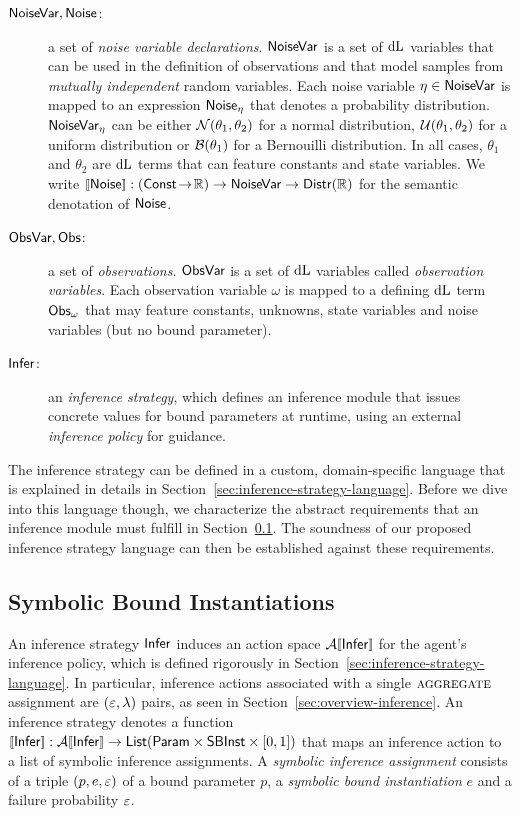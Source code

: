 \documentclass[acmsmall,screen,nonacm]{acmart}
\begin{document}
\begin{description}
  \item[$\mathsf{NoiseVar}, \mathsf{Noise}$:] a set of \emph{noise variable declarations}. $\mathsf{NoiseVar}$ is a set of $\mathop{}\!\mathrm{d} \text{L}$ variables that can be used in the definition of observations and that model samples from \emph{mutually independent} random variables. Each  {noise variable} $\eta \in \mathsf{NoiseVar}$ is mapped to an expression $\mathsf{Noise}_\eta$ that denotes a probability distribution. $\mathsf{NoiseVar}_\eta$ can be either $\mathcal{N}(\theta_1, \theta_2)$ for a normal distribution, $\mathcal{U}(\theta_1, \theta_2)$ for a uniform distribution or $\mathcal{B}(\theta_1)$ for a Bernouilli distribution. In all cases, $\theta_1$ and $\theta_2$ are $\mathop{}\!\mathrm{d} \text{L}$ terms that can feature constants and state variables. We write $\sem{\Noise} : (\Const \toI \Reals) \to \NoiseVar \to \Distr(\Reals)$ for the semantic denotation of $\mathsf{Noise}$.
  \item[$\mathsf{ObsVar}, \mathsf{Obs}$:] a set of \emph{observations}. $\mathsf{ObsVar}$ is a set of $\mathop{}\!\mathrm{d} \text{L}$ variables called \emph{observation variables}. Each observation variable $\omega$ is mapped to a defining $\mathop{}\!\mathrm{d} \text{L}$ term $\mathsf{Obs}_\omega$ that may feature constants, unknowns, state variables and noise variables (but no bound parameter).
 \item[$\mathsf{Infer}$:] an \emph{inference strategy}, which defines an inference module that issues concrete values for bound parameters at runtime, using an external \emph{inference policy} for guidance.
\end{description}
\makeMathKeywordMath
The inference strategy can be defined in a custom, domain-specific language that is explained in details in Section~\ref{sec:inference-strategy-language}. Before we dive into this language though, we characterize the abstract requirements that an inference module must fulfill in Section~\ref{sec:symbolic-inference-bounds}. The soundness of our proposed inference strategy language can then be established against these requirements.

\subsection{Symbolic Bound Instantiations}\label{sec:symbolic-inference-bounds}

An inference strategy $\mathsf{Infer}$ induces an action space $\InfActionSem{\Inference}$ for the agent's inference policy, which is defined rigorously in Section~\ref{sec:inference-strategy-language}. In particular, inference actions associated with a single $\textsc{aggregate}$ assignment are $(\varepsilon, \lambda)$ pairs, as seen in Section~\ref{sec:overview-inference}. An inference strategy denotes a function $\sem{\Inference} : \InfActionSem{\Inference} \to \List{\Param \times \SymbBoundExpr \times \EpsType}$ that maps an inference action to a list of {symbolic inference assignments}. A \emph{symbolic inference assignment} consists of a triple $(p, e, \varepsilon)$ of a bound parameter $p$, a \emph{symbolic bound instantiation} $e$ and a failure probability $\varepsilon$.
\end{document}
